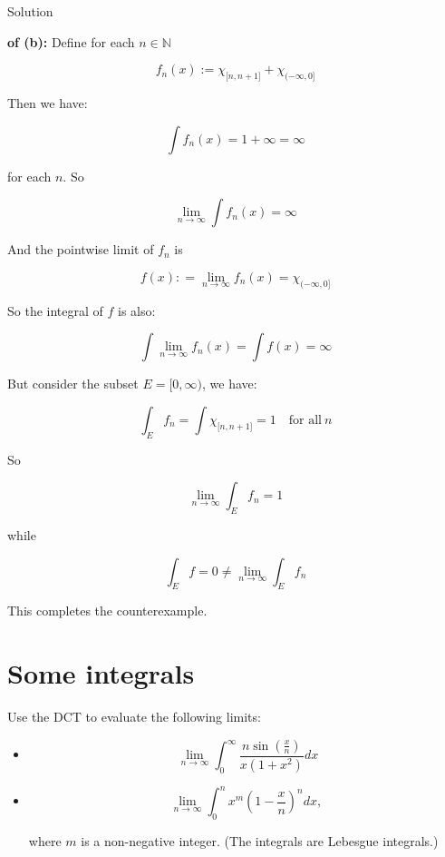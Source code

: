 \begin{qlsolution}{Solution}

\textbf{of (b):} Define for each \(n \in \mathbb{N}\)

\[f_{n}(x) := \chi_{\lbrack n,n + 1\rbrack} + \chi_{( - \infty,0\rbrack}\]

Then we have:

\[\int f_{n}(x) = 1 + \infty = \infty\]

for each \(n\). So

\[\lim\limits_{n\rightarrow\infty}\int f_{n}(x) = \infty\]

And the pointwise limit of \(f_{n}\) is

\[f(x): = \lim\limits_{n\rightarrow\infty}f_{n}(x) = \chi_{( - \infty,0\rbrack}\]

So the integral of \(f\) is also:

\[\int\lim\limits_{n\rightarrow\infty}f_{n}(x) = \int f(x) = \infty\]

But consider the subset \(E = \lbrack 0,\infty)\), we have:

\[\int_{E}f_{n} = \int\chi_{\lbrack n,n + 1\rbrack} = 1\quad\text{for all}\ n\]

So

\[\lim\limits_{n\rightarrow\infty}\int_{E}f_{n} = 1\]

while

\[\int_{E}f = 0 \neq \lim\limits_{n\rightarrow\infty}\int_{E}f_{n}\]

This completes the counterexample.

\end{qlsolution}

\section{Some integrals}\label{some-integrals}

Use the DCT to evaluate the following limits:

\begin{itemize}
\item
  \[\ \lim\limits_{n\rightarrow\infty}\int_{0}^{\infty}\frac{n\sin\left( \frac{x}{n} \right)}{x(1 + x^{2})} dx\]
\item
  \[\lim\limits_{n\rightarrow\infty}\int_{0}^{n}x^{m}\left( {1 - \frac{x}{n}} \right)^{n} dx,\]

  where \(m\) is a non-negative integer. (The integrals are Lebesgue integrals.)
\end{itemize}

